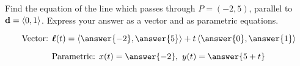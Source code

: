 \documentclass{ximera}
\author{Gregory Hartman \and Matthew Carr}
\begin{document}
\begin{exercise}



Find the equation of the line which passes through $P=(-2,5)$, parallel to $\mathbf{d}=\left\langle 0,1\right\rangle$. Express your answer as a vector and as parametric equations.

\begin{prompt}
\[
\text{Vector:  } \vecl(t)=\vector{\answer{-2},\answer{5}}+t\vector{\answer{0},\answer{1}}
\]
\end{prompt}
\begin{prompt}
\[
\text{Parametric:  } x(t)=\answer{-2},\ y(t)=\answer{5+t}
\]
\end{prompt}


\end{exercise}
\end{document}
